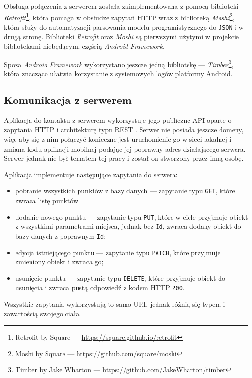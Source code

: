 \documentclass[polish,polish,a4paper,12pt]{article}
\begin{document}
	Obsługa połączenia z serwerem została zaimplementowana z pomocą biblioteki \textit{Retrofit}\footnote{Retrofit by Square — \url{https://square.github.io/retrofit}}, która pomaga w obsłudze zapytań HTTP wraz z biblioteką \textit{Moshi}\footnote{Moshi by Square — \url{https://github.com/square/moshi}}, która służy do automatyzacji parsowania modelu programistycznego do \texttt{JSON} i w drugą stronę. Biblioteki \textit{Retrofit} oraz \textit{Moshi} są pierwszymi użytymi w projekcie bibliotekami niebędącymi częścią \textit{Android Framework}.

	Spoza \textit{Android Framework} wykorzystano jeszcze jedną bibliotekę — \textit{Timber}\footnote{Timber by Jake Wharton — \url{https://github.com/JakeWharton/timber}}, która znacząco ułatwia korzystanie z systemowych logów platformy Android.

	\subsection{Komunikacja z serwerem}

	Aplikacja do kontaktu z serwerem wykorzystuje jego publiczne API oparte o zapytania HTTP i architekturę typu REST \cite{restwiki}. Serwer nie posiada jeszcze domeny, więc aby się z nim połączyć konieczne jest uruchomienie go w sieci lokalnej i zmiana kodu aplikacji mobilnej podając jej poprawny adres działającego serwera. Serwer jednak nie był tematem tej pracy i został on stworzony przez inną osobę.

	Aplikacja implementuje następujące zapytania do serwera:

	\begin{itemize}
		\item pobranie wszystkich punktów z bazy danych — zapytanie typu \texttt{GET}, które zwraca listę punktów;
		\item dodanie nowego punktu — zapytanie typu \texttt{PUT}, które w ciele przyjmuje obiekt z wszystkimi parametrami miejsca, jednak bez \texttt{Id}, zwraca dodany obiekt do bazy danych z poprawnym \texttt{Id};
		\item edycja istniejącego punktu — zapytanie typu \texttt{PATCH}, które przyjmuje zmieniony obiekt i zwraca go;
		\item usunięcie punktu — zapytanie typu \texttt{DELETE}, które przyjmuje obiekt do usunięcia i zwraca pustą odpowiedź z kodem HTTP \texttt{200}.
	\end{itemize}

	Wszystkie zapytania wykorzystują to samo URI, jednak różnią się typem i zawartością swojego ciała.
\end{document}
